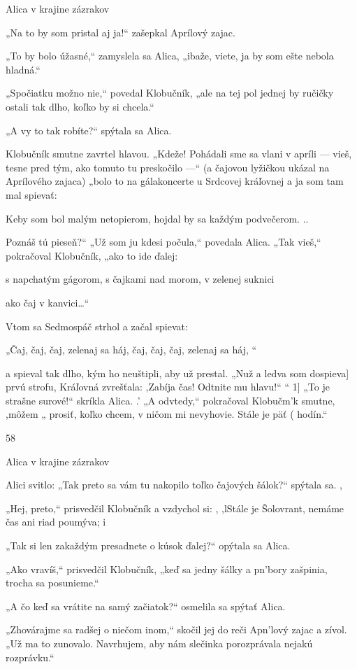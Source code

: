 \documentclass[12pt]{book}
\begin{document}
\begin{Parallel}[p]{}{}
{Alica v krajine zázrakov

„Na to by som pristal aj ja!“ zašepkal Aprílový zajac.

„To by bolo úžasné,“ zamyslela sa Alica, „ibaže, viete, ja
by som ešte nebola hladná.“

„Spočiatku možno nie,“ povedal Klobučník, „ale na tej
pol jednej by ručičky ostali tak dlho, koľko by si chcela.“

„A vy to tak robíte?“ spýtala sa Alica.

Klobučník smutne zavrtel hlavou. „Kdeže! Pohádali sme
sa vlani v apríli — vieš, tesne pred tým, ako tomuto tu
preskočilo —“ (a čajovou lyžičkou ukázal na Aprílového
zajaca) „bolo to na gálakoncerte u Srdcovej kráľovnej a ja
som tam mal spievať:

Keby som bol malým netopierom,
hojdal by sa každým podvečerom. ..

Poznáš tú pieseň?“
„Už som ju kdesi počula,“ povedala Alica.
„Tak vieš,“ pokračoval Klobučník, „ako to ide ďalej:

s napchatým gágorom,
s čajkami nad morom,
v zelenej suknici

ako čaj v kanvici…“

Vtom sa Sedmospáč strhol a začal spievat:

„Čaj, čaj, čaj, zelenaj sa háj,
čaj, čaj, čaj, zelenaj sa háj, “

a spieval tak dlho, kým ho neuštipli, aby už prestal.
„Nuž a ledva som dospieva] prvú strofu, Kráľovná
zvrešťala:
  ,Zabíja čas! Odtnite mu hlavu!“ “
1] „To je strašne surové!“ skríkla Alica.
.' „A odvtedy,“ pokračoval Klobučm'k smutne, ,môžem
„ prosiť, koľko chcem, v ničom mi nevyhovie. Stále je päť
( hodín.“

58

Alica v krajine zázrakov

Alici svitlo: „Tak preto sa vám tu nakopilo toľko čajových
šálok?“ spýtala sa.  ,

„Hej, preto,“ prisvedčil Klobučník a vzdychol si: , ,lStále je
Šolovrant, nemáme čas ani riad poumýva; i

„Tak si len zakaždým presadnete o kúsok ďalej?“ opýtala
sa Alica.

„Ako vravíš,“ prisvedčil Klobučník, „keď sa jedny šálky
a pn'bory zašpinia, trocha sa posunieme.“

„A čo keď sa vrátite na samý začiatok?“ osmelila sa spýtať
Alica.

„Zhovárajme sa radšej o niečom inom,“ skočil jej do reči
Apn'lový zajac a zívol. „Už ma to zunovalo. Navrhujem, aby
nám slečinka porozprávala nejakú rozprávku.“

}
\end{Parallel}
\end{document}
